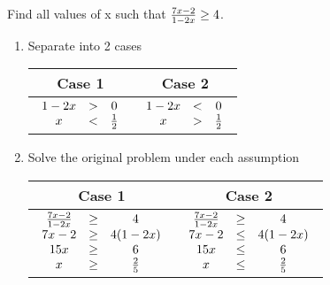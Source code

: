 \begin{exercise}\nonumber
	Find all values of x such that $ {7x - 2 \over 1 - 2x} \ge 4 $. \\

	\begin{enumerate}
		\item
		      Separate into 2 cases \\
		      \begin{table}[H]
			      \centering
			      \begin{tabular}{|c|c|} \hline
				      \textbf{Case 1} & \textbf{Case 2}                \\ \hline
				      $ \begin{array}{ccc} 1 - 2x & > & 0 \\ x & < & {1 \over 2} \end{array} $
				                      & $ \begin{array}{ccc} 1 - 2x & < & 0 \\ x & > & {1 \over 2} \end{array} $ \\ \hline
			      \end{tabular}
		      \end{table}

		\item
		      Solve the original problem under each assumption \\
		      \begin{table}[H]
			      \centering
			      \begin{tabular}{|c|c|} \hline
				      \textbf{Case 1} & \textbf{Case 2}                \\ \hline
				      $ \begin{array}{ccc} {7x-2 \over 1-2x} & \ge & 4 \\ 7x - 2 & \ge & 4(1-2x) \\ 15x & \ge & 6 \\ x & \ge & {2 \over 5} \end{array} $
				                      & $ \begin{array}{ccc} {7x-2 \over 1-2x} & \ge & 4 \\ 7x - 2 & \le & 4(1-2x) \\ 15x & \le & 6 \\ x & \le & {2 \over 5} \end{array} $ \\ \hline
			      \end{tabular}
		      \end{table}


\end{enumerate}
\end{exercise}
